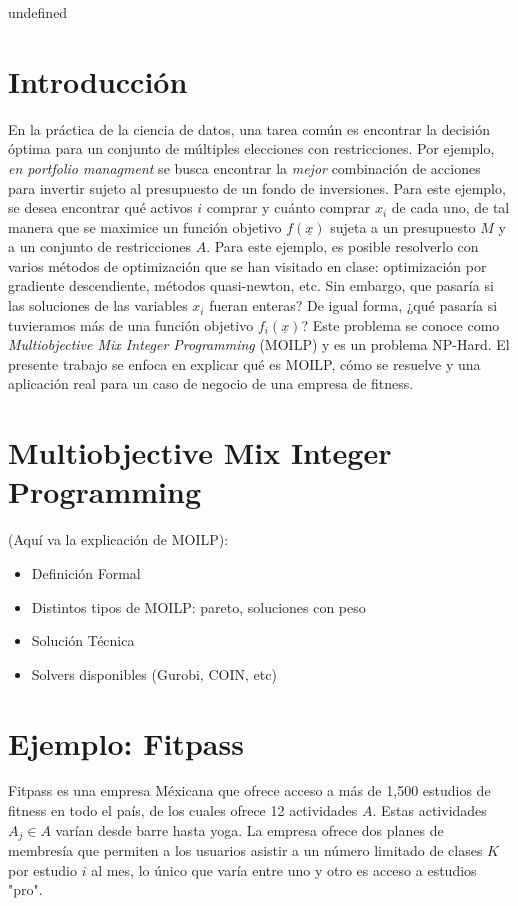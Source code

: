 undefined

\begin{titlepage}

\end{titlepage}

\section{Introducción}

En la práctica de la ciencia de datos, una tarea común es encontrar la decisión óptima para un conjunto de múltiples elecciones con restricciones. Por ejemplo, \textit{en portfolio managment} se busca encontrar la \textit{mejor} combinación de acciones para invertir sujeto al presupuesto de un fondo de inversiones. Para este ejemplo, se desea encontrar qué activos $i$ comprar y cuánto comprar $x_i$ de cada uno, de tal manera que se maximice un función objetivo $f(\underline{x})$ sujeta a un presupuesto $M$ y a un conjunto de restricciones $A$. Para este ejemplo, es posible resolverlo con varios métodos de optimización que se han visitado en clase: optimización por gradiente descendiente, métodos quasi-newton, etc. Sin embargo, que pasaría si las soluciones de las variables $x_i$ fueran enteras? De igual forma, ¿qué pasaría si tuvieramos más de una función objetivo $f_{i}(\underline{x})$? Este problema se conoce como \textit{Multiobjective Mix Integer Programming} (MOILP) y es un problema NP-Hard. El presente trabajo se enfoca en explicar qué es MOILP, cómo se resuelve y una aplicación real para un caso de negocio de una empresa de fitness.

\section{Multiobjective Mix Integer Programming}

(Aquí va la explicación de MOILP):
\begin{itemize}
    \item Definición Formal
    \item Distintos tipos de MOILP: pareto, soluciones con peso
    \item Solución Técnica
    \item Solvers disponibles (Gurobi, COIN, etc)
\end{itemize}

\section{Ejemplo: Fitpass}
Fitpass es una empresa Méxicana que ofrece acceso a más de 1,500 estudios de fitness en todo el país, de los cuales ofrece 12 actividades $A$. Estas actividades $A_{j} \in A$ varían desde barre hasta yoga. La empresa ofrece dos planes de membresía que permiten a los usuarios asistir a un número limitado de clases $K$ por estudio $i$ al mes, lo único que varía entre uno y otro es acceso a estudios "pro". 


